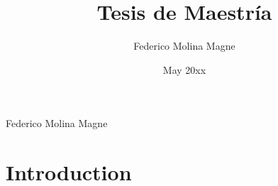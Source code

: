 \documentclass[msc,oneside,a4paper]{udelar} %
\title{Tesis de Maestría}
\subtitle{}
\author{Federico Molina Magne}
\institute{}
\date{May 20xx}
\begin{document}
  \maketitle
  \begin{author}
    Federico Molina Magne
  \end{author}

  \frontmatter  %
  \listoffigures	         %
  \listoftables	         %
  \listadesimbolos 		     %
  \listadenotaciones 	     %
  \listadesiglas 		     %
  \tableofcontents           %
  \mainmatter %
  \backmatter %
  
  \glosario 		         %
  \apenarabicnumbering
  \apenmatter				 %
  \anexarabicnumbering
  \anexmatter				 %
%  
  \hypertarget{introduction}{%
  \chapter*{Introduction}\label{introduction}}
  
\end{document}
